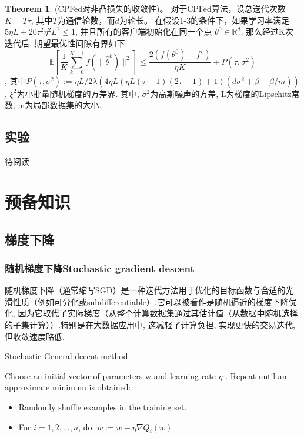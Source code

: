 \documentclass[a4paper]{article}
\theoremstyle{definition}
\newtheorem{theorem}{Theorem}[section]
\numberwithin{equation}{section}
\begin{document}
\begin{theorem}
(CPFed对非凸损失的收敛性)。
对于CPFed算法，设总送代次数$K=T\tau$, 其中$T$为通信轮数，而$d$为轮长。
在假设1-3的条件下，如果学习率满足$5\eta L +20 \tau ^2\eta^2 L^2 \leqslant 1$, 并且所有的客户端初始化在同一个点 $\theta ^0 \in \mathbb{R}^d$, 那么经过K次迭代后, 期望最优性间隙有界如下:
\begin{equation}
  \mathbb{E} \left[  \frac{1}{K} \sum_{k=0}^{K-1}f( \| \hat{\theta}^k) \|^2  \right]\leqslant 
  \frac{2(f(\theta^0)- f^\star)}{ \eta K} + P(\tau, \sigma^2) 
\end{equation}
, 其中$P(\tau,\sigma^2) := \eta L /2 \lambda (4 \eta L(\eta L(\tau -1)(2 \tau-1)+1) (d \sigma^2+\beta - \beta /m ))$, $\xi^2$为小批量随机梯度的方差界. 其中, $\sigma^2$为高斯噪声的方差, L为梯度的Lipschitz常数, m为局部数据集的大小.
\end{theorem}   



\subsection{实验}
待阅读





\section{预备知识}

\subsection{梯度下降}
\subsubsection{随机梯度下降Stochastic gradient descent}
随机梯度下降（通常缩写SGD）是一种迭代方法用于优化的目标函数与合适的光滑性质（例如可分化或subdifferentiable）.它可以被看作是随机逼近的梯度下降优化, 因为它取代了实际梯度（从整个计算数据集通过其估计值（从数据中随机选择的子集计算））.特别是在大数据应用中, 这减轻了计算负担, 实现更快的交易迭代, 但收敛速度略低. 
\begin{algorithm}  
    \caption{ Stochastic  General decent method}  
    \begin{algorithmic}
          
\State Choose an initial vector of parameters  w and learning rate  $\eta$ .
Repeat until an approximate minimum is obtained:
\begin{itemize}
    \item Randomly shuffle examples in the training set.
    \item For $  i=1, 2, ..., n$,  do:
    $w:=w-\eta \nabla Q_{i}(w)$ 
\end{itemize}
    \end{algorithmic}  
   \end{algorithm}  
\end{document}
